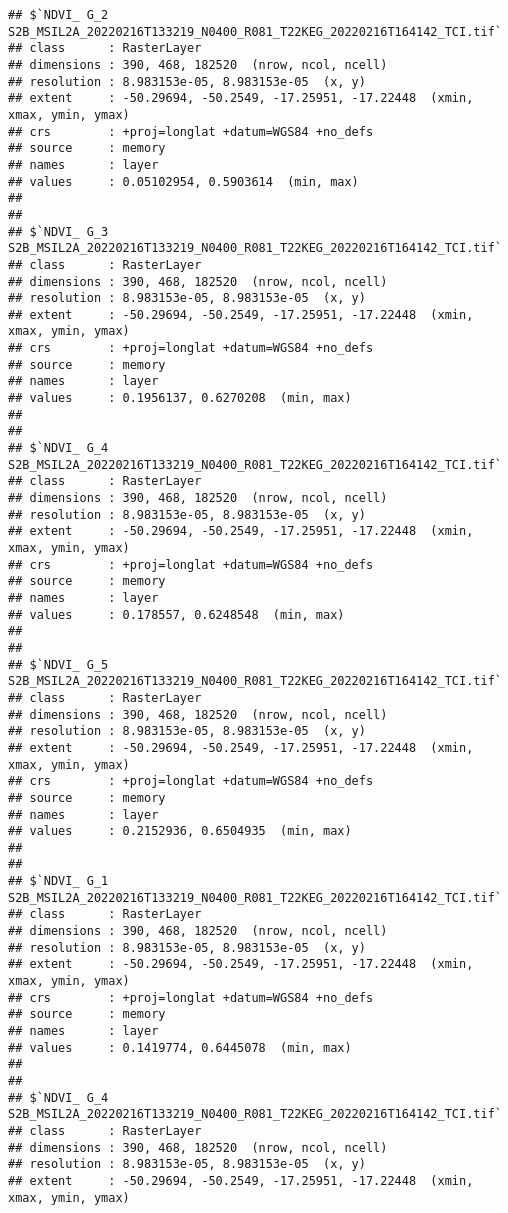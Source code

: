 \documentclass[
]{article}
\begin{document}
\begin{verbatim}
## $`NDVI_ G_2 S2B_MSIL2A_20220216T133219_N0400_R081_T22KEG_20220216T164142_TCI.tif`
## class      : RasterLayer 
## dimensions : 390, 468, 182520  (nrow, ncol, ncell)
## resolution : 8.983153e-05, 8.983153e-05  (x, y)
## extent     : -50.29694, -50.2549, -17.25951, -17.22448  (xmin, xmax, ymin, ymax)
## crs        : +proj=longlat +datum=WGS84 +no_defs 
## source     : memory
## names      : layer 
## values     : 0.05102954, 0.5903614  (min, max)
## 
## 
## $`NDVI_ G_3 S2B_MSIL2A_20220216T133219_N0400_R081_T22KEG_20220216T164142_TCI.tif`
## class      : RasterLayer 
## dimensions : 390, 468, 182520  (nrow, ncol, ncell)
## resolution : 8.983153e-05, 8.983153e-05  (x, y)
## extent     : -50.29694, -50.2549, -17.25951, -17.22448  (xmin, xmax, ymin, ymax)
## crs        : +proj=longlat +datum=WGS84 +no_defs 
## source     : memory
## names      : layer 
## values     : 0.1956137, 0.6270208  (min, max)
## 
## 
## $`NDVI_ G_4 S2B_MSIL2A_20220216T133219_N0400_R081_T22KEG_20220216T164142_TCI.tif`
## class      : RasterLayer 
## dimensions : 390, 468, 182520  (nrow, ncol, ncell)
## resolution : 8.983153e-05, 8.983153e-05  (x, y)
## extent     : -50.29694, -50.2549, -17.25951, -17.22448  (xmin, xmax, ymin, ymax)
## crs        : +proj=longlat +datum=WGS84 +no_defs 
## source     : memory
## names      : layer 
## values     : 0.178557, 0.6248548  (min, max)
## 
## 
## $`NDVI_ G_5 S2B_MSIL2A_20220216T133219_N0400_R081_T22KEG_20220216T164142_TCI.tif`
## class      : RasterLayer 
## dimensions : 390, 468, 182520  (nrow, ncol, ncell)
## resolution : 8.983153e-05, 8.983153e-05  (x, y)
## extent     : -50.29694, -50.2549, -17.25951, -17.22448  (xmin, xmax, ymin, ymax)
## crs        : +proj=longlat +datum=WGS84 +no_defs 
## source     : memory
## names      : layer 
## values     : 0.2152936, 0.6504935  (min, max)
## 
## 
## $`NDVI_ G_1 S2B_MSIL2A_20220216T133219_N0400_R081_T22KEG_20220216T164142_TCI.tif`
## class      : RasterLayer 
## dimensions : 390, 468, 182520  (nrow, ncol, ncell)
## resolution : 8.983153e-05, 8.983153e-05  (x, y)
## extent     : -50.29694, -50.2549, -17.25951, -17.22448  (xmin, xmax, ymin, ymax)
## crs        : +proj=longlat +datum=WGS84 +no_defs 
## source     : memory
## names      : layer 
## values     : 0.1419774, 0.6445078  (min, max)
## 
## 
## $`NDVI_ G_4 S2B_MSIL2A_20220216T133219_N0400_R081_T22KEG_20220216T164142_TCI.tif`
## class      : RasterLayer 
## dimensions : 390, 468, 182520  (nrow, ncol, ncell)
## resolution : 8.983153e-05, 8.983153e-05  (x, y)
## extent     : -50.29694, -50.2549, -17.25951, -17.22448  (xmin, xmax, ymin, ymax)

\end{verbatim}
\end{document}
